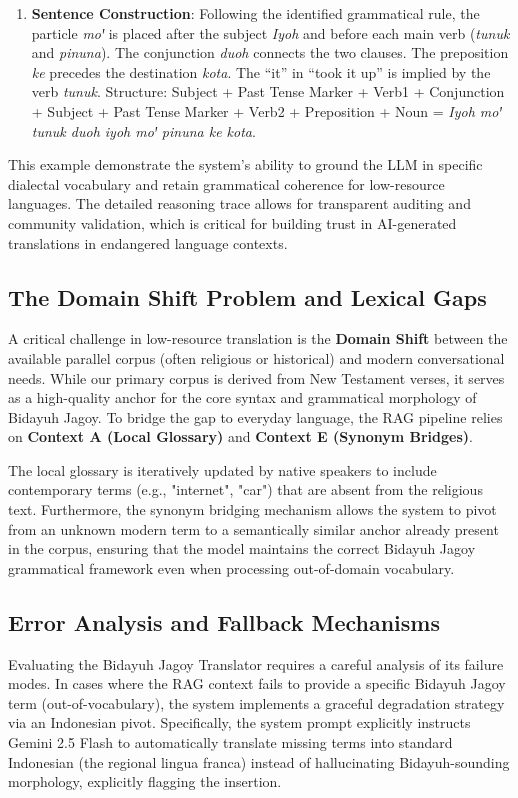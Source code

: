 \documentclass[12pt]{article}
\begin{document}
\begin{itemize}[leftmargin=10pt]
\begin{enumerate}[leftmargin=10pt]
        \item \textbf{Sentence Construction}: Following the identified grammatical rule, the particle \emph{moꞌ} is placed after the subject \emph{Iyoh} and before each main verb (\emph{tunuk} and \emph{pinuna}). The conjunction \emph{duoh} connects the two clauses. The preposition \emph{ke} precedes the destination \emph{kota}. The ``it'' in ``took it up'' is implied by the verb \emph{tunuk}. Structure: Subject + Past Tense Marker + Verb1 + Conjunction + Subject + Past Tense Marker + Verb2 + Preposition + Noun = \emph{Iyoh moꞌ tunuk duoh iyoh moꞌ pinuna ke kota}.
    \end{enumerate}
\end{itemize}
This example demonstrate the system's ability to ground the LLM in specific dialectal vocabulary and retain grammatical coherence for low-resource languages. The detailed reasoning trace allows for transparent auditing and community validation, which is critical for building trust in AI-generated translations in endangered language contexts.

\subsection{The Domain Shift Problem and Lexical Gaps}
A critical challenge in low-resource translation is the \textbf{Domain Shift} between the available parallel corpus (often religious or historical) and modern conversational needs. While our primary corpus is derived from New Testament verses, it serves as a high-quality anchor for the core syntax and grammatical morphology of Bidayuh Jagoy. To bridge the gap to everyday language, the RAG pipeline relies on \textbf{Context A (Local Glossary)} and \textbf{Context E (Synonym Bridges)}. 

The local glossary is iteratively updated by native speakers to include contemporary terms (e.g., "internet", "car") that are absent from the religious text. Furthermore, the synonym bridging mechanism allows the system to pivot from an unknown modern term to a semantically similar anchor already present in the corpus, ensuring that the model maintains the correct Bidayuh Jagoy grammatical framework even when processing out-of-domain vocabulary.

\subsection{Error Analysis and Fallback Mechanisms}
Evaluating the Bidayuh Jagoy Translator requires a careful analysis of its failure modes. In cases where the RAG context fails to provide a specific Bidayuh Jagoy term (out-of-vocabulary), the system implements a graceful degradation strategy via an Indonesian pivot. Specifically, the system prompt explicitly instructs Gemini 2.5 Flash to automatically translate missing terms into standard Indonesian (the regional lingua franca) instead of hallucinating Bidayuh-sounding morphology, explicitly flagging the insertion.
\end{document}
